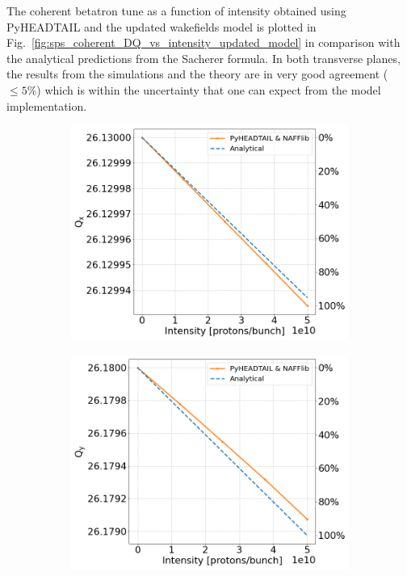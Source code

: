  The coherent betatron tune as a function of intensity obtained using PyHEADTAIL and the updated wakefields model is plotted in Fig.~\ref{fig:sps_coherent_DQ_vs_intensity_updated_model} in comparison with the analytical predictions from the Sacherer formula. In both transverse planes, the results from the simulations and the theory are in very good agreement ($\leq 5\%$) which is within the uncertainty that one can expect from the model implementation. 

\begin{figure}[!ht]
    \centering
    \begin{subfigure}[t]{0.45\textwidth}
        \centering
        \includegraphics[width=1\textwidth]{images/Ch7/Qx_vs_intensity_complete_impedance_sps_q26model_updated_MD2018_parameters_integer.png}
    \end{subfigure}
    \hfill
    \begin{subfigure}[t]{0.45\textwidth}
        \centering
        \includegraphics[width=1\textwidth]{images/Ch7/Qy_vs_intensity_complete_impedance_sps_q26model_updated_MD2018_parameters_integer.png}

\end{subfigure}
\end{figure}
